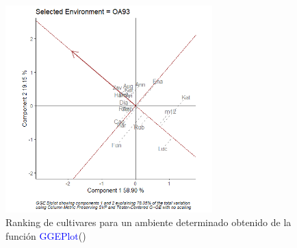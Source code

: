 \begin{itemize}[wide, nosep, labelindent = 0pt, topsep = 1ex]
\begin{tcolorbox}[skin=bicolor,
    colframe=aurometalsaurus,colback=backcolour,colbacklower=white,
    width=1\linewidth,
    height=0.7\linewidth,
    boxsep=-3mm]
\begin{figure}[H]
	\begin{center}
		\includegraphics[width=8cm]{./Graficos/SelectedEnvironment.png}
	\end{center}
	\caption{Ranking de cultivares para un ambiente determinado obtenido de la función \textcolor{blue}{GGEPlot}()}
\end{figure}
\end{tcolorbox} 


\end{itemize}

